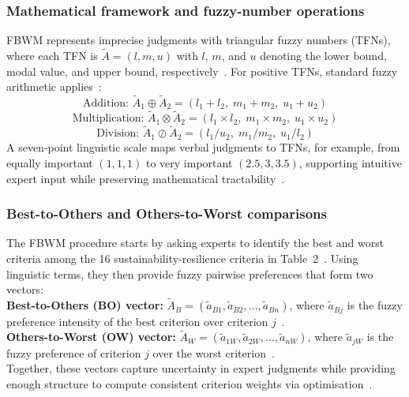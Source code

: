 \documentclass[preprint,12pt]{elsarticle}
\begin{document}
\subsubsection{Mathematical framework and fuzzy-number operations}
FBWM represents imprecise judgments with triangular fuzzy numbers (TFNs), where each TFN is $\tilde{A}=(l,m,u)$ with $l$, $m$, and $u$ denoting the lower bound, modal value, and upper bound, respectively~\citep{li_etal_2021_sc_fintech,haseli_2024_sf_bwm_cis}. For positive TFNs, standard fuzzy arithmetic applies~\citep{El_Bettioui_Zaim_Sbihi_2023,li_etal_2021_sc_fintech}:
\[
\text{Addition: } \tilde{A}_1 \oplus \tilde{A}_2 = (l_1+l_2,\; m_1+m_2,\; u_1+u_2)
\]
\[
\text{Multiplication: } \tilde{A}_1 \otimes \tilde{A}_2 = (l_1 \times l_2,\; m_1 \times m_2,\; u_1 \times u_2)
\]
\[
\text{Division: } \tilde{A}_1 \oslash \tilde{A}_2 = (l_1/u_2,\; m_1/m_2,\; u_1/l_2)
\]
A seven-point linguistic scale maps verbal judgments to TFNs, for example, from equally important $(1,1,1)$ to very important $(2.5,3,3.5)$, supporting intuitive expert input while preserving mathematical tractability~\citep{ratandhara_kumar_2023_bwm,El_Bettioui_Zaim_Sbihi_2023}.

\subsubsection{Best-to-Others and Others-to-Worst comparisons}
The FBWM procedure starts by asking experts to identify the best and worst criteria among the 16 sustainability-resilience criteria in Table~2~\citep{Afrasiabi_Tavana_DiCaprio_2022,gan_2019_resilient_supplier_ddns}. Using linguistic terms, they then provide fuzzy pairwise preferences that form two vectors: \\
\textbf{Best-to-Others (BO) vector:} $\tilde{A}_B=(\tilde{a}_{B1},\tilde{a}_{B2},\ldots,\tilde{a}_{Bn})$, where $\tilde{a}_{Bj}$ is the fuzzy preference intensity of the best criterion over criterion $j$~\citep{El_Bettioui_Zaim_Sbihi_2023}. \\
\textbf{Others-to-Worst (OW) vector:} $\tilde{A}_W=(\tilde{a}_{1W},\tilde{a}_{2W},\ldots,\tilde{a}_{nW})$, where $\tilde{a}_{jW}$ is the fuzzy preference of criterion $j$ over the worst criterion~\citep{haseli_2024_sf_bwm_cis,ratandhara_kumar_2023_bwm}. \\
Together, these vectors capture uncertainty in expert judgments while providing enough structure to compute consistent criterion weights via optimisation~\citep{li_etal_2021_sc_fintech,petrovic_etal_2022_axioms_efqm_fbwm_fmoora}.
\end{document}

